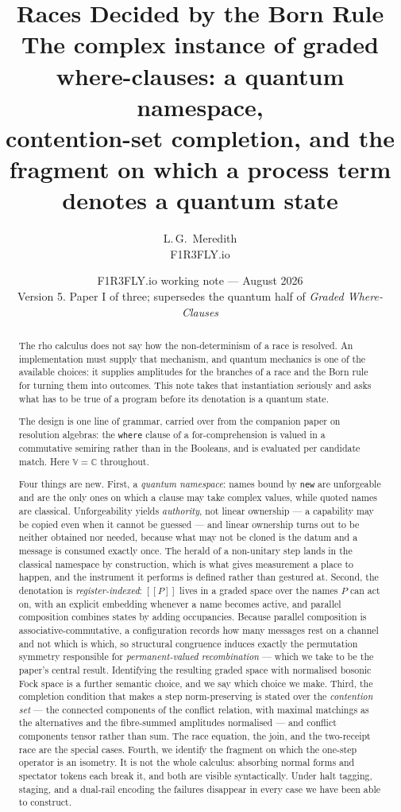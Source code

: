 \documentclass[11pt,a4paper]{article}
\title{\bfseries Races Decided by the Born Rule\\[4pt]
\large The complex instance of graded where-clauses: a quantum namespace,\\
contention-set completion, and the fragment on which a process term\\
denotes a quantum state}
\author{L.\,G.\ Meredith\\ \small F1R3FLY.io}
\date{F1R3FLY.io working note --- August 2026\\[2pt]
\normalsize Version 5. Paper I of three; supersedes the quantum half of
\emph{Graded Where-Clauses}}
\theoremstyle{plain}
\theoremstyle{definition}
\theoremstyle{remark}
\newcommand{\sem}[1]{[\![#1]\!]}
\newcommand{\V}{\mathbb{V}}
\newcommand{\Cx}{\mathbb{C}}
\begin{document}
\maketitle

\begin{abstract}
The rho calculus does not say how the non-determinism of a race is resolved. An
implementation must supply that mechanism, and quantum mechanics is one of the
available choices: it supplies amplitudes for the branches of a race and the
Born rule for turning them into outcomes. This note takes that instantiation
seriously and asks what has to be true of a program before its denotation is a
quantum state.

The design is one line of grammar, carried over from the companion paper on
resolution algebras: the \texttt{where} clause of a for-comprehension is valued
in a commutative semiring rather than in the Booleans, and is evaluated per
candidate match. Here $\V = \Cx$ throughout.

Four things are new. First, a \emph{quantum namespace}: names bound by
\texttt{new} are unforgeable and are the only ones on which a clause may take
complex values, while quoted names are classical. Unforgeability yields
\emph{authority}, not linear ownership --- a capability may be copied even when
it cannot be guessed --- and linear ownership turns out to be neither obtained
nor needed, because what may not be cloned is the datum and a message is
consumed exactly once. The herald of a non-unitary step lands in the classical
namespace by construction, which is what gives measurement a place to happen,
and the instrument it performs is defined rather than gestured at. Second, the denotation is \emph{register-indexed}: $\sem{P}$ lives in a graded
space over the names $P$ can act on, with an explicit embedding whenever a name
becomes active, and parallel composition combines states by adding occupancies.
Because parallel composition is associative-commutative, a configuration records
how many messages rest on a channel and not which is which, so structural
congruence induces exactly the permutation symmetry responsible for
\emph{permanent-valued recombination} --- which we take to be the paper's
central result. Identifying the resulting graded space with normalised bosonic
Fock space is a further semantic choice, and we say which choice we make. Third, the completion condition that makes a step
norm-preserving is stated over the \emph{contention set} --- the connected
components of the conflict relation, with maximal matchings as the alternatives
and the fibre-summed amplitudes normalised --- and conflict components tensor
rather than sum. The race equation, the join, and the two-receipt race are the
special cases. Fourth, we identify the fragment on which the one-step operator
is an isometry. It is not the whole calculus: absorbing normal forms and
spectator tokens each break it, and both are visible syntactically. Under halt
tagging, staging, and a dual-rail encoding the failures disappear in every case
we have been able to construct.


\end{abstract}
\end{document}
